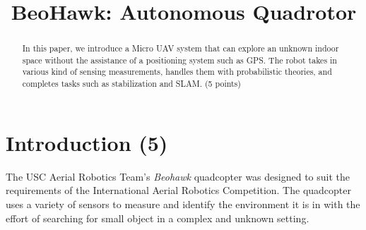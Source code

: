 \documentclass[12pt, letterpaper]{article}
\title{BeoHawk: Autonomous Quadrotor}
\begin{document}

\maketitle
\begin{people}
\end{people}

\begin{abstract}
	In this paper, we introduce a Micro UAV system that can explore an unknown indoor space without the assistance of a positioning system such as GPS. The robot takes in various kind of sensing measurements, handles them with probabilistic theories, and completes tasks such as stabilization and SLAM. (5 points)
\end{abstract}

\section{Introduction (5)}
The USC Aerial Robotics Team's \textit{Beohawk} quadcopter was designed to suit the requirements of the International Aerial Robotics Competition. The quadcopter uses a variety of sensors to measure and identify the environment it is in with the effort of searching for small object in a complex and unknown setting.
\end{document}
